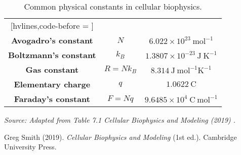 \documentclass{article}
\begin{document}
\begin{table}[!h]
\centering
\begin{NiceTabular}{||c|c|c||}[hvlines,code-before = ]


 &
 &
 \\

\textbf{Avogadro's constant} & $N$ & $6.022\times 10^{23} \ \mathrm{mol}^{-1}$ \\
\textbf{Boltzmann's constant} & $k_B$ & $1.3807\times 10^{-23} \ \mathrm{J} \ \mathrm{K}^{-1}$ \\
\textbf{Gas constant} & $R=Nk_B$ & $8.314 \ \mathrm{J} \ \mathrm{mol}^{-1} \mathrm{K^{-1}}$ \\
\textbf{Elementary charge} & $q$ & $1.0622 \ \mathrm{C}$ \\
\textbf{Faraday's constant} & $F=Nq$ & $9.6485 \times 10^4 \ \mathrm{C} \ \mathrm{mol}^{-1}$ \\


\end{NiceTabular}

\caption{Common physical constants in cellular biophysics.}
\label{tab:quantities}
\vspace{2mm}
{\footnotesize \textit{Source: Adapted from Table 7.1 \textit{Cellular Biophysics and Modeling} (2019) \cite{smith2019biophysics}.}}
\end{table}

\begin{thebibliography}{9}
Greg Smith (2019). \textit{Cellular Biophysics and Modeling} (1st ed.). Cambridge University Press.
\end{thebibliography}
\end{document}
